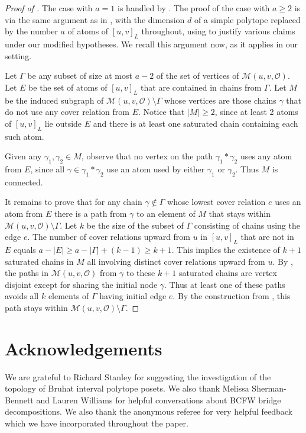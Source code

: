 \documentclass[12pt]{amsart}
\theoremstyle{plain}
\theoremstyle{definition}
\theoremstyle{remark}
\begin{document}
\begin{proof}[Proof of ]
The case with $a=1$ is handled by . The proof of the case with $a \geq 2$ is via the same argument as in \cite{AER}, with the dimension $d$ of a simple polytope replaced by the number $a$ of atoms of $[u,v]_L$ throughout, using  to justify various claims under our modified hypotheses. We recall this argument now, as it applies in our setting.
     
Let $\Gamma$ be any subset of size at most $a-2$ of the set of vertices of $\mathcal{M}(u,v,\mathcal{O})$.  Let $E$ be the set of atoms of $[u,v]_L$ that are contained in chains from $\Gamma$. Let $M$ be the induced subgraph of $\mathcal{M}(u,v,\mathcal{O})\setminus \Gamma $ whose vertices are those chains $\gamma$ that do not use any cover relation from $E$. Notice that $|M|\ge 2$, since at least 2 atoms of $[u,v]_L$ lie outside $E$ and there is at least one saturated chain containing each such atom.

Given any $\gamma_1,\gamma_2\in M$, observe that no vertex on the path $\gamma_1 * \gamma_2$ uses any atom from $E$, since all $\gamma \in \gamma_1 * \gamma_2$ use an atom used by either $\gamma_1$ or $\gamma_2$.  Thus $M$ is connected.
     
It remains to prove that for any chain $\gamma \not \in \Gamma $ whose lowest cover relation $e$ uses an atom from $E$ there is a path from $\gamma $ to an element of $M$ that stays within  $\mathcal{M}(u,v,\mathcal{O}) \setminus \Gamma$.  Let $k$ be the size of the subset of $\Gamma $ consisting of chains using the edge $e$.  The number of cover relations upward from $u$ in $[u,v]_L$ that are not in $E$ equals  $a - |E| \ge a - |\Gamma | + (k-1)  \ge k+1$.  This implies the existence of $k+1$ saturated chains in $M$ all involving distinct cover relations upward from $u$.  By , the paths in $\mathcal{M}(u,v,\mathcal{O})$ from $\gamma $ to these $k+1$ saturated chains are vertex disjoint except for sharing the initial node $\gamma $.  Thus at least one of these paths  avoids all $k$ elements of $\Gamma $ having initial edge $e$.  By the construction from , this path stays within $\mathcal{M}(u,v,\mathcal{O}) \setminus \Gamma $.  
\end{proof}

\section*{Acknowledgements}

We are grateful to Richard Stanley for suggesting the investigation of the topology of Bruhat interval polytope posets. We also thank Melissa Sherman-Bennett and Lauren Williams for helpful conversations about BCFW bridge decompositions. We also thank  the anonymous referee for very helpful feedback which we have incorporated throughout the paper.



\end{document}
